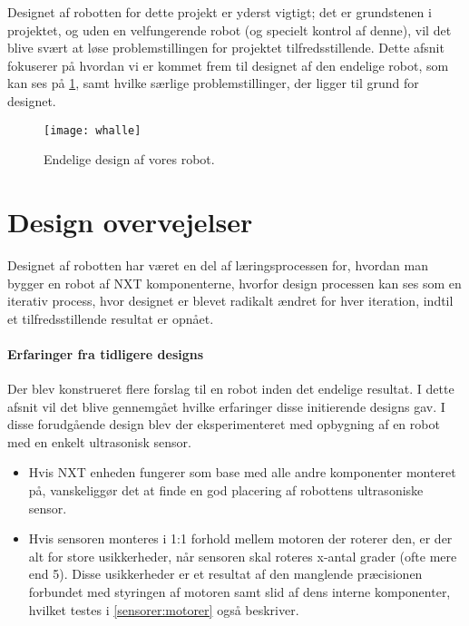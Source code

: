 Designet af robotten for dette projekt er yderst vigtigt; det er grundstenen i projektet, og uden en velfungerende robot (og specielt kontrol af denne), vil det blive svært at løse problemstillingen for projektet tilfredsstillende.
Dette afsnit fokuserer på hvordan vi er kommet frem til designet af den endelige robot, som kan ses på \cref{robot:opbygning}, samt hvilke særlige problemstillinger, der ligger til grund for designet.

\begin{figure}
\centering
\texttt{[image: whalle]}
\caption{Endelige design af vores robot.}
\label{robot:opbygning}
\end{figure}

\section{Design overvejelser}\label{robot:design}
Designet af robotten har været en del af læringsprocessen for, hvordan man bygger en robot af \lego NXT komponenterne, hvorfor design processen kan ses som en iterativ process, hvor designet er blevet radikalt ændret for hver iteration, indtil et tilfredsstillende resultat er opnået.


\paragraph{Erfaringer fra tidligere designs} 
Der blev konstrueret flere forslag til en robot inden det endelige resultat. 
I dette afsnit vil det blive gennemgået hvilke erfaringer disse initierende designs gav.
I disse forudgående design blev der eksperimenteret med opbygning af en robot med en enkelt ultrasonisk sensor.

\begin{itemize}
\item Hvis NXT enheden fungerer som base med alle andre komponenter monteret på, vanskeliggør det at finde en god placering af robottens ultrasoniske sensor.

\item Hvis sensoren monteres i 1:1 forhold mellem motoren der roterer den, er der alt for store usikkerheder, når sensoren skal roteres x-antal grader (ofte mere end 5\degree).
Disse usikkerheder er et resultat af den manglende præcisionen forbundet med styringen af motoren samt slid af dens interne komponenter, hvilket testes i \cref{sensorer:motorer} også beskriver.
\end{itemize}

